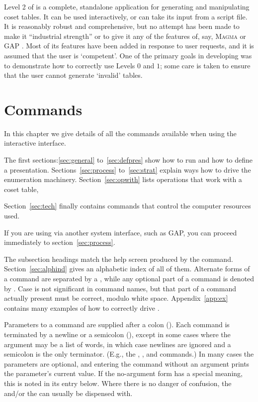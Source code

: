 
%
%

Level 2 of {\ace} is a complete, standalone application for generating and
  manipulating coset tables.
It can be used interactively, or can take its input from a script file.
It is reasonably robust and comprehensive, but no attempt has been made to
  make it ``industrial strength'' or to give it any of the features of, say,
  \textsc{Magma} \cite{BCP} or \textsf{GAP} \cite{Sch}.
Most of its features have been added in response to user requests, and it
  is assumed that the user is `competent'\kern-1.5pt.
One of the primary goals in developing {\ace} was to demonstrate how to
  correctly use {\ace} Levels $0$ and $1$; some care is taken to ensure
  that the user cannot generate `invalid' tables.

\section{Commands}\label{sec:cmd}

In this chapter we give details of all the commands available when
  using the interactive interface.

The first sections:\ref{sec:general} to~\ref{sec:defpres} show how to run
{\ace} and  how to define a presentation.
Sections~\ref{sec:process} to~\ref{sec:strat} explain ways how to drive the
enumeration machinery.
Section~\ref{sec:opwith} lists operations that work with a coset table,

Section~\ref{sec:tech} finally contains commands that control the computer
resources used.

If you are using {\ace} via another system interface, such as {\sf GAP}, you
can proceed immediately to section~\ref{sec:process}.

The subsection headings match the help screen produced by the 
  command. Section~\ref{sec:alphind} gives an alphabetic index of all of
  them.
%
Alternate forms of a command are separated by a \ttt{/}\kern-1pt, while
  any optional part of a command is denoted by \ttt{[\dots]}.
Case is not significant in command names, but that part of a command
  actually present must be correct, modulo white space.
%
Appendix~\ref{app:ex} contains many examples of how to correctly drive
  \ace.

Parameters to a command are supplied after a colon (\ttt{:}).  
Each command is terminated by a newline or a semicolon (\ttt{;}), except
  in some cases where the argument may be a list of words, in which case
  newlines are ignored and a semicolon is the only terminator.
(E.g., the , ,  and 
  commands.)
In many cases the parameters are optional, and entering the command
  without an argument prints the parameter's current value.
If the no-argument form has a special meaning, this is noted in its entry
  below.
Where there is no danger of confusion, the \ttt{:} and/or the \ttt{;} can
  usually be dispensed with.

